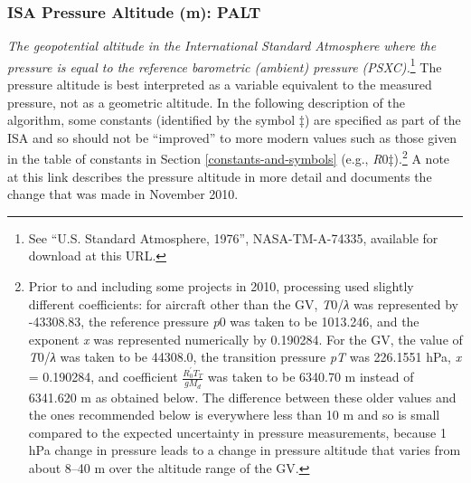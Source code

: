 \documentclass[
]{book}
\begin{document}
\hypertarget{palt}{%
\subsubsection*{ISA Pressure Altitude (m): PALT}\label{palt}}

\emph{The geopotential altitude in the International Standard Atmosphere where the pressure is equal to the reference barometric (ambient) pressure (PSXC).}\footnote{See ``U.S. Standard Atmosphere, 1976'', NASA-TM-A-74335, available for download at this URL.}
The pressure altitude is best interpreted as a variable equivalent to the measured pressure, not as a geometric altitude. In the following description of the algorithm, some constants (identified by the symbol {‡}) are specified as part of the ISA and so should not be ``improved'' to more modern values such as those given in the table of constants in Section \ref{constants-and-symbols} (e.g., {\emph{R}0‡).}\footnote{Prior to and including some projects in 2010, processing used slightly different coefficients: for aircraft other than the GV, {\emph{T}0/\emph{λ}} was represented by -43308.83, the reference pressure {\emph{p}0} was taken to be 1013.246, and the exponent {\emph{x}} was represented numerically by 0.190284. For the GV, the value of {\emph{T}0/\emph{λ}} was taken to be 44308.0, the transition pressure {\emph{p}\emph{T}} was 226.1551 hPa, {\emph{x}} = 0.190284, and coefficient {\(\frac{R_{0}^{\prime}T_{T}}{gM_{d}}\)} was taken to be 6340.70 m instead of 6341.620 m as obtained below. The difference between these older values and the ones recommended below is everywhere less than 10 m and so is small compared to the expected uncertainty in pressure measurements, because 1 hPa change in pressure leads to a change in pressure altitude that varies from about 8--40 m over the altitude range of the GV.}
A note at this link describes the pressure altitude in more detail and documents the change that was made in November 2010.
\end{document}
